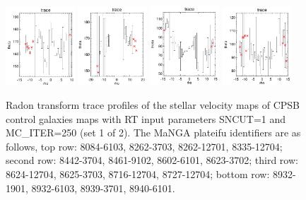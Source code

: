 \documentclass[fleqn,usenatbib]{mnras}
\begin{document}
\begin{figure}
    \includegraphics[width=0.23\textwidth]{Images/trace-plots/trace-plots-cpsb-controls/8932-1901.png}
    \includegraphics[width=0.23\textwidth]{Images/trace-plots/trace-plots-cpsb-controls/8932-6103.png}
    \includegraphics[width=0.23\textwidth]{Images/trace-plots/trace-plots-cpsb-controls/8939-3701.png}
    \includegraphics[width=0.23\textwidth]{Images/trace-plots/trace-plots-cpsb-controls/8940-6101.png}
    \caption{Radon transform trace profiles of the stellar velocity maps of CPSB control galaxies maps with RT input parameters SNCUT=1 and MC\_ITER=250 (set 1 of 2). The MaNGA plateifu identifiers are as follows, top row: 8084-6103, 8262-3703, 8262-12701, 8335-12704; second row: 8442-3704, 8461-9102, 8602-6101, 8623-3702; third row: 8624-12704, 8625-3703, 8716-12704, 8727-12704; bottom row: 8932-1901, 8932-6103, 8939-3701, 8940-6101.}
    \label{fig:Radon-traces-CPSB-controls-1}
\end{figure}
\end{document}
